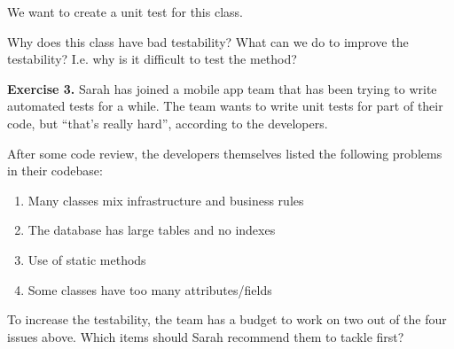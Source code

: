\begin{Shaded}
\begin{Highlighting}[]
 
 
    \NormalTok{(}
 
    \NormalTok{();}
 
\NormalTok{;}
 
    \NormalTok{ : }\NormalTok{;}
 
\NormalTok{  \}}
\NormalTok{\}}
\end{Highlighting}
\end{Shaded}

We want to create a unit test for this class.

Why does this class have bad testability? What can we do to improve the
testability? I.e. why is it difficult to test the method?

\textbf{Exercise 3.} Sarah has joined a mobile app team that has been
trying to write automated tests for a while. The team wants to write
unit tests for part of their code, but ``that's really hard'', according
to the developers.

After some code review, the developers themselves listed the following
problems in their codebase:

\begin{enumerate}
\def\labelenumi{\arabic{enumi}.}
\tightlist
\item
  Many classes mix infrastructure and business rules
\item
  The database has large tables and no indexes
\item
  Use of static methods
\item
  Some classes have too many attributes/fields
\end{enumerate}

To increase the testability, the team has a budget to work on two out of
the four issues above. Which items should Sarah recommend them to tackle
first?

